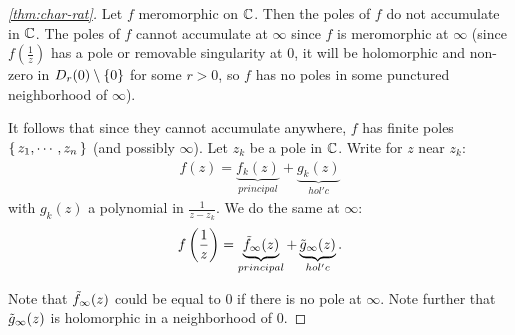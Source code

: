 \begin{proof}[\ref{thm:char-rat}]
Let $f$ meromorphic on $\mathbb{C}$. Then the poles of $f$ do not accumulate in $\mathbb{C}$. The poles of $f$ cannot accumulate at $\infty$ since $f$ is meromorphic at $\infty$ (since $f(\frac{1}{z})$ has a pole or removable singularity at $0$, it will be holomorphic and non-zero in $D_r (0) \setminus \{ 0 \}$ for some $r>0$, so $f$ has no poles in some punctured neighborhood of $\infty$). 

It follows that since they cannot accumulate anywhere, $f$ has finite poles $\set{z_1, \cdots ,z_n}$ (and possibly $\infty$). Let $z_k$ be a pole in $\mathbb{C}$. Write for $z$ near $z_k$:
\begin{align*}
    f(z) = \underbrace{f_k(z)}_{principal} + \underbrace{g_k(z)}_{hol'c}
\end{align*}
with $g_k(z)$ a polynomial in $\frac{1}{z-z_k}$. We do the same at $\infty$:
\begin{align*}
    f \left( \frac{1}{z} \right) = \underbrace{\Tilde{f}_\infty(z)}_{principal} + \underbrace{\Tilde{g}_\infty(z)}_{hol'c}.
\end{align*}

Note that $\Tilde{f}_\infty(z)$ could be equal to $0$ if there is no pole at $\infty$. Note further that $\Tilde{g}_\infty(z)$ is holomorphic in a neighborhood of $0$.


\end{proof}
